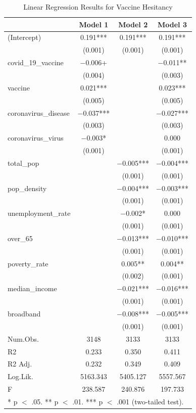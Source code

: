 \documentclass[
]{article}
\begin{document}
\begin{table}

\caption{\label{tab:vacc_hes_analysis}Linear Regression Results for Vaccine Hesitancy}
\centering
\begin{tabular}[t]{lccc}
\toprule
  & Model 1 & Model 2 & Model 3\\
\midrule
(Intercept) & \num{0.191}*** & \num{0.191}*** & \num{0.191}***\\
 & (\num{0.001}) & (\num{0.001}) & (\num{0.001})\\
covid\_19\_vaccine & \num{-0.006}+ &  & \num{-0.011}**\\
 & (\num{0.004}) &  & (\num{0.003})\\
vaccine & \num{0.021}*** &  & \num{0.023}***\\
 & (\num{0.005}) &  & (\num{0.005})\\
coronavirus\_disease & \num{-0.037}*** &  & \num{-0.027}***\\
 & (\num{0.003}) &  & (\num{0.003})\\
coronavirus\_virus & \num{-0.003}* &  & \num{0.000}\\
 & (\num{0.001}) &  & (\num{0.001})\\
total\_pop &  & \num{-0.005}*** & \num{-0.004}***\\
 &  & (\num{0.001}) & \vphantom{5} (\num{0.001})\\
pop\_density &  & \num{-0.004}*** & \num{-0.003}***\\
 &  & (\num{0.001}) & \vphantom{4} (\num{0.001})\\
unemployment\_rate &  & \num{-0.002}* & \num{0.000}\\
 &  & (\num{0.001}) & \vphantom{3} (\num{0.001})\\
over\_65 &  & \num{-0.013}*** & \num{-0.010}***\\
 &  & (\num{0.001}) & \vphantom{2} (\num{0.001})\\
poverty\_rate &  & \num{0.005}** & \num{0.004}**\\
 &  & (\num{0.002}) & (\num{0.001})\\
median\_income &  & \num{-0.021}*** & \num{-0.016}***\\
 &  & (\num{0.001}) & \vphantom{1} (\num{0.001})\\
broadband &  & \num{-0.008}*** & \num{-0.005}***\\
 &  & (\num{0.001}) & (\num{0.001})\\
\midrule
Num.Obs. & \num{3148} & \num{3133} & \num{3133}\\
R2 & \num{0.233} & \num{0.350} & \num{0.411}\\
R2 Adj. & \num{0.232} & \num{0.349} & \num{0.409}\\
Log.Lik. & \num{5163.343} & \num{5405.127} & \num{5557.567}\\
F & \num{238.587} & \num{240.876} & \num{197.733}\\
\bottomrule
\multicolumn{4}{l}{\rule{0pt}{1em}* p $<$ .05. ** p $<$ .01. *** p $<$ .001 (two-tailed test).}\\
\end{tabular}
\end{table}
\end{document}
